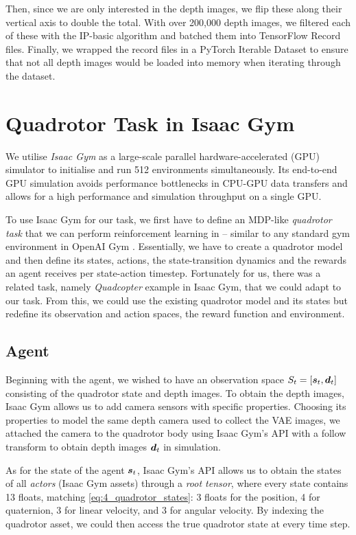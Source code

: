 Then, since we are only interested in the depth images, we flip these along their vertical axis to double the total. With over 200,000 depth images, we filtered each of these with the IP-basic algorithm \cite{filtering_depth_completion} and batched them into TensorFlow Record files. Finally, we wrapped the record files in a PyTorch Iterable Dataset to ensure that not all depth images would be loaded into memory when iterating through the dataset.


\section{Quadrotor Task in Isaac Gym}
We utilise \textit{Isaac Gym} \cite{IsaacGym} as a large-scale parallel hardware-accelerated (GPU) simulator to initialise and run 512 environments simultaneously. Its end-to-end GPU simulation avoids performance bottlenecks in CPU-GPU data transfers and allows for a high performance and simulation throughput on a single GPU.

To use Isaac Gym for our task, we first have to define an MDP-like \textit{quadrotor task} that we can perform reinforcement learning in -- similar to any standard gym environment in OpenAI Gym \cite{openAIgym}. Essentially, we have to create a quadrotor model and then define its states, actions, the state-transition dynamics and the rewards an agent receives per state-action timestep. Fortunately for us, there was a related task, namely \textit{Quadcopter} example in Isaac Gym, that we could adapt to our task. From this, we could use the existing quadrotor model and its states but redefine its observation and action spaces, the reward function and environment.

\subsection{Agent}
Beginning with the agent, we wished to have an observation space $S_t = [{\boldsymbol{s}}_t, {\boldsymbol{d}}_t]$ consisting of the quadrotor state and depth images. To obtain the depth images, Isaac Gym allows us to add camera sensors with specific properties. Choosing its properties to model the same depth camera used to collect the VAE images, we attached the camera to the quadrotor body using Isaac Gym's API with a follow transform to obtain depth images ${\boldsymbol{d}}_t$ in simulation.

As for the state of the agent ${\boldsymbol{s}}_t$, Isaac Gym's API allows us to obtain the states of all \textit{actors} (Isaac Gym assets) through a \textit{root tensor}, where every state contains 13 floats, matching \eqref{eq:4_quadrotor_states}: 3 floats for the position, 4 for quaternion, 3 for linear velocity, and 3 for angular velocity. By indexing the quadrotor asset, we could then access the true quadrotor state at every time step.

